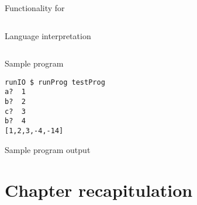 \documentclass[thesis-solanki.tex]{subfiles}
\begin{document}
\begin{code-list}[H]
\begin{singlespace}
\inputminted[linenos, firstline=130, lastline=152]{haskell}{IOSketchM.hs}
\end{singlespace}
\caption{Functionality for }
\label{tab:iosketchmxmmonadfunctionality}
\end{code-list}

\begin{code-list}[H]
\begin{singlespace}
\inputminted[linenos, firstline=161, lastline=184]{haskell}{IOSketchM.hs}
\end{singlespace}
\caption{Language interpretation}
\label{tab:iosketchmlanguageinterpretation}
\end{code-list}


\begin{code-list}[H]
\begin{singlespace}
\inputminted[linenos, firstline=201, lastline=228]{haskell}{IOSketchM.hs}
\end{singlespace}
\caption{Sample program}
\label{tab:iosketchmsampleprogram}
\end{code-list}

\begin{code-list}[H]
\begin{singlespace}
\begin{verbatim}
runIO $ runProg testProg 
a?  1
b?  2
c?  3
b?  4
[1,2,3,-4,-14]
\end{verbatim}
\end{singlespace}
\caption{Sample program output}
\label{tab:iosketchmsampleprogramoutput}
\end{code-list}


\section{Chapter recapitulation}

\ifMain
\begin{scope}
  \nolinenumbers
  \enotesize
  \par
  \begin{singlespace}
  \setlength{\parskip}{12pt plus 2pt minus 1pt}
  \theendnotes
  \par
  \end{singlespace}
\end{scope}
\fi
\end{document}
